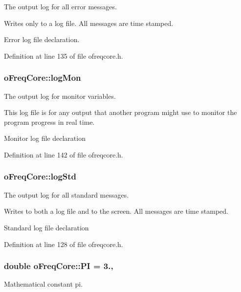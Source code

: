The output log for all error messages. 

Writes only to a log file. All messages are time stamped.

Error log file declaration. 

Definition at line 135 of file ofreqcore.\-h.

\hypertarget{classosea_1_1ofreq_1_1o_freq_core_a3432825cd5d03858fca93c85a055f0d4}{
\subsubsection[{log\-Mon}]{ o\-Freq\-Core\-::log\-Mon\hspace{0.3cm}{\ttfamily [static]}}}\label{classosea_1_1ofreq_1_1o_freq_core_a3432825cd5d03858fca93c85a055f0d4}


The output log for monitor variables. 

This log file is for any output that another program might use to monitor the program progress in real time.

Monitor log file declaration 

Definition at line 142 of file ofreqcore.\-h.

\hypertarget{classosea_1_1ofreq_1_1o_freq_core_a58bc30d906c3092933a8fa71fc43081f}{
\subsubsection[{log\-Std}]{ o\-Freq\-Core\-::log\-Std\hspace{0.3cm}{\ttfamily [static]}}}\label{classosea_1_1ofreq_1_1o_freq_core_a58bc30d906c3092933a8fa71fc43081f}


The output log for all standard messages. 

Writes to both a log file and to the screen. All messages are time stamped.

Standard log file declaration 

Definition at line 128 of file ofreqcore.\-h.

\hypertarget{classosea_1_1ofreq_1_1o_freq_core_a4322d17b5d6a31ae1118aba876b46c88}{
\subsubsection[{P\-I}]{\setlength{\rightskip}{0pt plus 5cm}double o\-Freq\-Core\-::\-P\-I = 3.\hspace{0.3cm}{\ttfamily [static]}, {\ttfamily [protected]}}}\label{classosea_1_1ofreq_1_1o_freq_core_a4322d17b5d6a31ae1118aba876b46c88}
Mathematical constant pi. 

